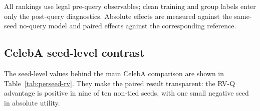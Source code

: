 \documentclass{article}
\begin{document}
\begin{table}[H]
\caption{Full 20-seed Waterbirds extension summary. Values are mean absolute or paired effects in pp; intervals are 10,000-replicate percentile bootstrap intervals over seeds. The Entropy comparison is available in the released CSV but omitted here for space.}
\label{tab:rv-waterbirds-20-full}
\centering
\scriptsize
\setlength{\tabcolsep}{2.2pt}
\end{table}

All rankings use legal pre-query observables; clean training and group labels enter
only the post-query diagnostics. Absolute effects are measured against the
same-seed no-query model and paired effects against the corresponding reference.

\subsection{CelebA seed-level contrast}

The seed-level values behind the main CelebA comparison are shown in Table~\ref{tab:perseed-rv}. They make the paired result transparent: the RV-Q advantage is positive in nine of ten non-tied seeds, with one small negative seed in absolute utility.
\end{document}
